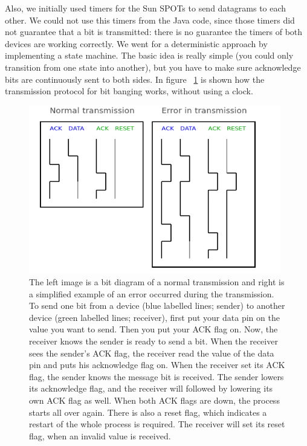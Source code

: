 \documentclass[a4paper,10pt]{article} %
\begin{document}
Also, we initially used timers for the Sun SPOTs to send datagrams to each
other. We could not use this timers from the Java code, since those timers did
not guarantee that a bit is transmitted: there is no guarantee the timers of
both devices are working correctly. We went for a deterministic approach by
implementing a state machine. The basic idea is really simple (you could only
transition from one state into another), but you have to make sure acknowledge
bits are continuously sent to both sides. In figure ~\ref{fig:handshaking} is
shown how the transmission protocol for bit banging works, without using a
clock.

\begin{figure}[H]
\label{fig:handshaking}
\centering
\includegraphics[width=11cm]{img/handshaking.png}
\caption{The left image is a bit diagram of a normal transmission and right is a
simplified example of an error occurred during the transmission. To send one bit
from a device (blue labelled lines; sender) to another device (green labelled
lines; receiver), first put your data pin on the value you want to send. Then
you put your ACK flag on. Now, the receiver knows the sender is ready to send a
bit.  When the receiver sees the sender's ACK flag, the receiver read the value
of the data pin and puts his acknowledge flag on. When the receiver set its ACK
flag, the sender knows the message bit is received. The sender lowers its
acknowledge flag, and the receiver will followed by lowering its own ACK flag as
well. When both ACK flags are down, the process starts all over again. There is
also a reset flag, which indicates a restart of the whole process is required.
The receiver will set its reset flag, when an invalid value is received.}
\end{figure}

\end{document}
